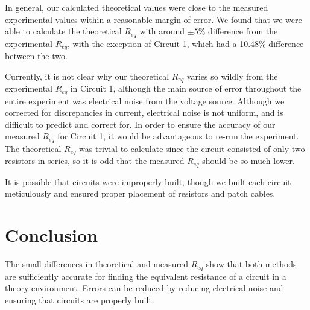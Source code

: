 \documentclass[12pt,letterpaper,titlepage]{report}
\begin{document}
In general, our calculated theoretical values were close to the measured experimental values within a reasonable margin of error. We found that we were able to calculate the theoretical $R_{eq}$ with around $\pm 5\%$ difference from the experimental $R_{eq}$, with the exception of Circuit 1, which had a 10.48\% difference between the two.

\medskip


Currently, it is not clear why our theoretical $R_{eq}$ varies so wildly from the experimental $R_{eq}$ in Circuit 1, although the main source of error throughout the entire experiment was electrical noise from the voltage source. Although we corrected for discrepancies in current, electrical noise is not uniform, and is difficult to predict and correct for. In order to ensure the accuracy of our measured $R_{eq}$ for Circuit 1, it would be advantageous to re-run the experiment. The theoretical $R_{eq}$ was trivial to calculate since the circuit consisted of only two resistors in series, so it is odd that the measured $R_{eq}$ should be so much lower.

\medskip
It is possible that circuits were improperly built, though we built each circuit meticulously and ensured proper placement of resistors and patch cables.



\section*{Conclusion}

The small differences in theoretical and measured $R_{eq}$ show that both methods are sufficiently accurate for finding the equivalent resistance of a circuit in a theory environment. Errors can be reduced by reducing electrical noise and ensuring that circuits are properly built.


\end{document}
